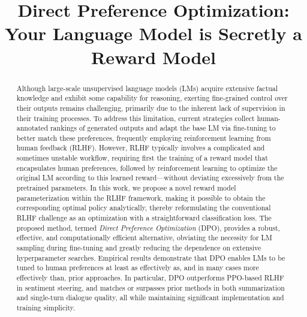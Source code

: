 \title{Direct Preference Optimization: Your Language Model is Secretly a Reward Model}

\begin{abstract}
Although large-scale unsupervised language models (LMs) acquire extensive factual knowledge and exhibit some capability for reasoning, exerting fine-grained control over their outputs remains challenging, primarily due to the inherent lack of supervision in their training processes. To address this limitation, current strategies collect human-annotated rankings of generated outputs and adapt the base LM via fine-tuning to better match these preferences, frequently employing reinforcement learning from human feedback (RLHF). However, RLHF typically involves a complicated and sometimes unstable workflow, requiring first the training of a reward model that encapsulates human preferences, followed by reinforcement learning to optimize the original LM according to this learned reward—without deviating excessively from the pretrained parameters. In this work, we propose a novel reward model parameterization within the RLHF framework, making it possible to obtain the corresponding optimal policy analytically, thereby reformulating the conventional RLHF challenge as an optimization with a straightforward classification loss. The proposed method, termed \textit{Direct Preference Optimization} (DPO), provides a robust, effective, and computationally efficient alternative, obviating the necessity for LM sampling during fine-tuning and greatly reducing the dependence on extensive hyperparameter searches. Empirical results demonstrate that DPO enables LMs to be tuned to human preferences at least as effectively as, and in many cases more effectively than, prior approaches. In particular, DPO outperforms PPO-based RLHF in sentiment steering, and matches or surpasses prior methods in both summarization and single-turn dialogue quality, all while maintaining significant implementation and training simplicity.
\end{abstract}

